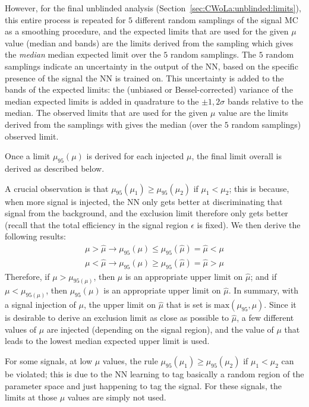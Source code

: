 However, for the final unblinded analysis (Section~\ref{sec:CWoLa:unblinded:limits}), this entire process is repeated for $5$ different random samplings of the signal MC as a smoothing procedure, and the expected limits that are used for the given $\mu$ value (median and bands) are the limits derived from the sampling which gives the \textit{median} median expected limit over the $5$ random samplings.
The $5$ random samplings indicate an uncertainty in the output of the NN, based on the specific presence of the signal the NN is trained on.
This uncertainty is added to the bands of the expected limits:
the (unbiased or Bessel-corrected) variance of the median expected limits is added in quadrature to the $\pm 1,2\sigma$ bands relative to the median.
The observed limits that are used for the given $\mu$ value are the limits derived from the samplings with gives the median (over the $5$ random samplings) observed limit.

Once a limit $\mu_{95}(\mu)$ is derived for each injected $\mu$, the final limit overall is derived as described below.

A crucial observation is that $\mu_{95}(\mu_1) \ge \mu_{95}(\mu_2)$ if $\mu_1<\mu_2$; this is because, when more signal is injected, the NN only gets better at discriminating that signal from the background, and the exclusion limit therefore only gets better (recall that the total efficiency in the signal region $\epsilon$ is fixed).
We then derive the following results:
\begin{align}
  \mu > \hat{\mu} \rightarrow \mu_{95}(\mu) \le \mu_{95}(\hat{\mu}) = \hat{\mu} < \mu \\
  \mu < \hat{\mu} \rightarrow \mu_{95}(\mu) \ge \mu_{95}(\hat{\mu}) = \hat{\mu} > \mu
\end{align}
Therefore, if $\mu>\mu_{95(\mu)}$, then $\mu$ is an appropriate upper limit on $\hat{\mu}$; and if $\mu<\mu_{95(\mu)}$, then $\mu_{95}(\mu)$ is an appropriate upper limit on $\hat{\mu}$.
In summary, with a signal injection of $\mu$, the upper limit on $\hat{\mu}$ that is set is $\text{max}\left(\mu_{95},\mu\right)$.
Since it is desirable to derive an exclusion limit as close as possible to $\hat{\mu}$, a few different values of $\mu$ are injected (depending on the signal region), and the value of $\mu$ that leads to the lowest median expected upper limit is used.

For some signals, at low $\mu$ values, the rule $\mu_{95}(\mu_1) \ge \mu_{95}(\mu_2)$ if $\mu_1<\mu_2$ can be violated; this is due to the NN learning to tag basically a random region of the parameter space and just happening to tag the signal.
For these signals, the limits at those $\mu$ values are simply not used.

